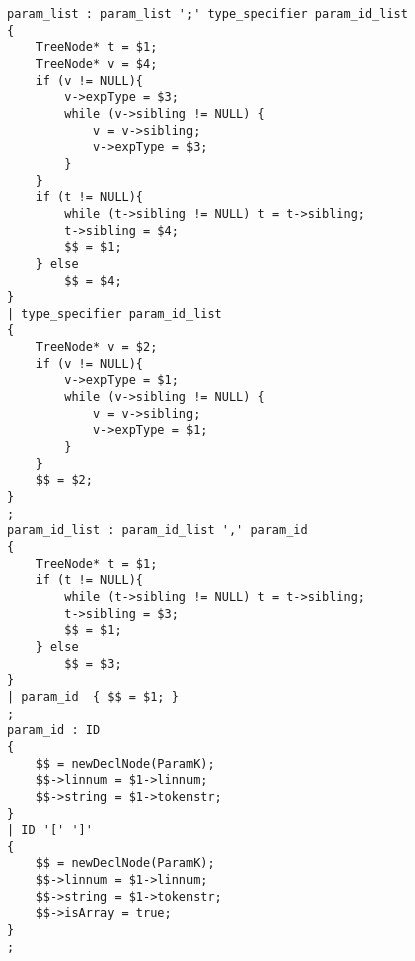 \documentclass[12pt]{book}
\begin{document}
\begin{lstlisting}
param_list : param_list ';' type_specifier param_id_list 
{
    TreeNode* t = $1;
    TreeNode* v = $4;
    if (v != NULL){
        v->expType = $3;
        while (v->sibling != NULL) {
            v = v->sibling;
            v->expType = $3;
        }
    }
    if (t != NULL){
        while (t->sibling != NULL) t = t->sibling;
        t->sibling = $4;
        $$ = $1;
    } else
        $$ = $4;
}
| type_specifier param_id_list 
{
    TreeNode* v = $2;
    if (v != NULL){
        v->expType = $1;
        while (v->sibling != NULL) {
            v = v->sibling;
            v->expType = $1;
        }
    } 
    $$ = $2;
}
;
param_id_list : param_id_list ',' param_id 
{
    TreeNode* t = $1;
    if (t != NULL){
        while (t->sibling != NULL) t = t->sibling;
        t->sibling = $3;
        $$ = $1;
    } else
        $$ = $3;
}
| param_id  { $$ = $1; }
;
param_id : ID 
{
    $$ = newDeclNode(ParamK);
    $$->linnum = $1->linnum;
    $$->string = $1->tokenstr;
}
| ID '[' ']' 
{
    $$ = newDeclNode(ParamK);
    $$->linnum = $1->linnum;
    $$->string = $1->tokenstr;
    $$->isArray = true;
}
;


\end{lstlisting}
\end{document}
